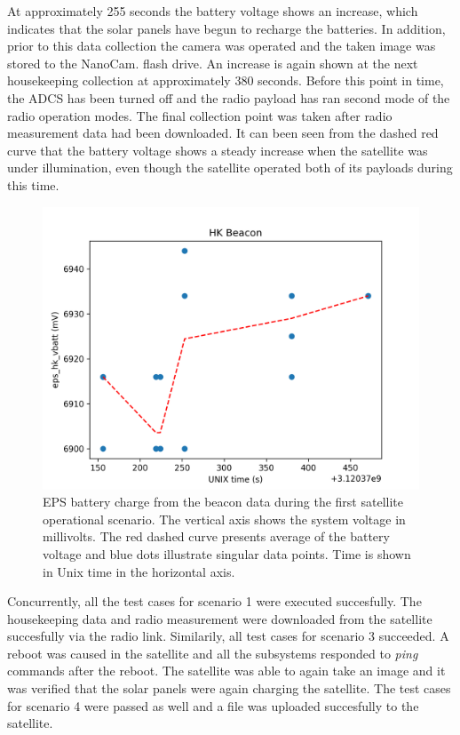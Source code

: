 \documentclass[english,12pt,a4paper,pdftex,elec,utf8]{aaltothesis}
\begin{document}
At approximately 255 seconds the battery voltage shows an increase, which indicates that the solar panels have begun to recharge the batteries. In addition, prior to this data collection the camera was operated and the taken image was stored to the NanoCam. flash drive. An increase is again shown at the next housekeeping collection at approximately 380 seconds. Before this point in time, the ADCS has been turned off and the radio payload has ran second mode of the radio operation modes. The final collection point was taken after radio measurement data had been downloaded. It can been seen from the dashed red curve that the battery voltage shows a steady increase when the satellite was under illumination, even though the satellite operated both of its payloads during this time.  
\par
\begin{figure}[h!]
\centering
%
\includegraphics[scale=0.7]{hk_plot1_mod}
\caption{EPS battery charge from the beacon data during the first satellite operational scenario. The vertical axis shows the system voltage in millivolts. The red dashed curve presents average of the battery voltage and blue dots illustrate singular data points. Time is shown in Unix time in the horizontal axis. }
\label{epsvbatt}
\end{figure}  
Concurrently, all the test cases for scenario 1 were executed succesfully. The housekeeping data and radio measurement were downloaded from the satellite succesfully via the radio link. Similarily, all test cases for scenario 3 succeeded. A reboot was caused in the satellite and all the subsystems responded to \textit{ping} commands after the reboot. The satellite was able to again take an image and it was verified that the solar panels were again charging the satellite. The test cases for scenario 4 were passed as well and a file was uploaded succesfully to the satellite.\par 
\end{document}
